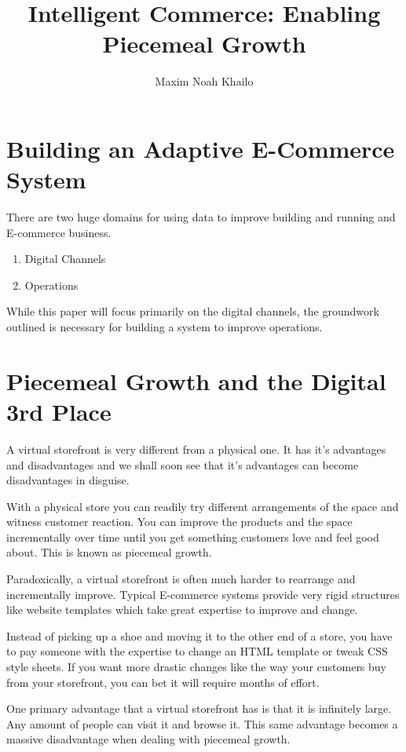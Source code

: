 \documentclass[11pt]{article}
\title{Intelligent Commerce: Enabling Piecemeal Growth}
\author{Maxim Noah Khailo}
\begin{document}
\maketitle
\section{Building an Adaptive E-Commerce System}

There are two huge domains for using data to improve building and running
and E-commerce business. 

\begin{enumerate} 
    \item Digital Channels
    \item Operations
\end{enumerate} 

While this paper will focus primarily on the digital channels, the groundwork outlined
is necessary for building a system to improve operations.

\section{Piecemeal Growth and the Digital 3rd Place}

A virtual storefront is very different from a physical one. It has it's 
advantages and disadvantages and we shall soon see that it's advantages can 
become disadvantages in disguise. 

With a physical store you can readily try different arrangements of the space and
witness customer reaction. You can improve the products and the space
incrementally over time until you get something customers love and feel good about.
This is known as piecemeal growth.

Paradoxically, a virtual storefront is often much harder to rearrange and incrementally
improve. Typical E-commerce systems provide very rigid structures like website
templates which take great expertise to improve and change. 

Instead of picking up a shoe and moving it to the other end of a store, you have 
to pay someone with the expertise to change an HTML template or tweak CSS style sheets.
If you want more drastic changes like the way your customers buy from your storefront,
you can bet it will require months of effort.

One primary advantage that a virtual storefront has is that it is infinitely large. Any
amount of people can visit it and browse it. This same advantage becomes a massive
disadvantage when dealing with piecemeal growth.
\end{document}
